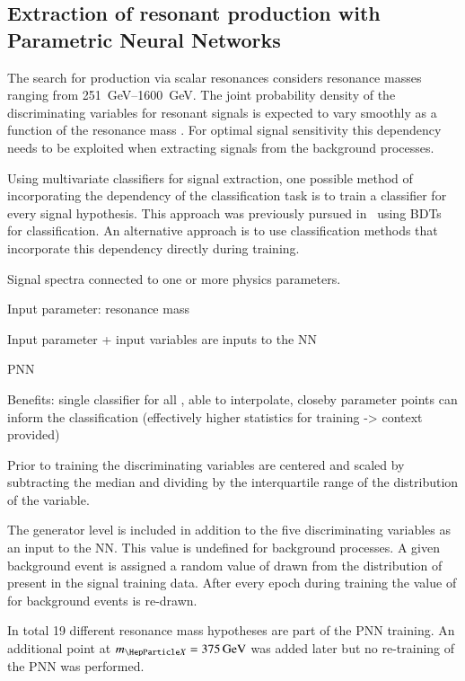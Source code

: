 \subsection{Extraction of resonant \HH production with Parametric
  Neural Networks}
\label{sec:mva_pnn}

The search for \HH production via scalar resonances considers
resonance masses ranging from \SIrange{251}{1600}{\GeV}. The joint
probability density of the discriminating variables for resonant \HH
signals is expected to vary smoothly as a function of the resonance
mass \mX. For optimal signal sensitivity this dependency needs to be
exploited when extracting signals from the background processes.

Using multivariate classifiers for signal extraction, one possible
method of incorporating the \mX dependency of the classification task
is to train a classifier for every signal hypothesis. This approach
was previously pursued in~\cite{HIGG-2016-16-witherratum} using BDTs
for classification. An alternative approach is to use classification
methods that incorporate this dependency directly during training.

Signal spectra connected to one or more physics parameters.

Input parameter: resonance mass \mX

Input parameter + input variables are inputs to the NN

PNN~\cite{Baldi:2016fzo}

Benefits: single classifier for all \mX, able to interpolate, closeby
parameter points can inform the classification (effectively higher
statistics for training -> context provided)

Prior to training the discriminating variables are centered and scaled
by subtracting the median and dividing by the interquartile range of
the distribution of the variable.

The generator level \mX is included in addition to the five
discriminating variables as an input to the NN. This value is
undefined for background processes. A given background event is
assigned a random value of \mX drawn from the distribution of \mX
present in the signal training data. After every epoch during training
the value of \mX for background events is re-drawn.

In total 19 different resonance mass hypotheses are part of the PNN
training. An additional point at $\mX = \SI{375}{\GeV}$ was added
later but no re-training of the PNN was performed.

